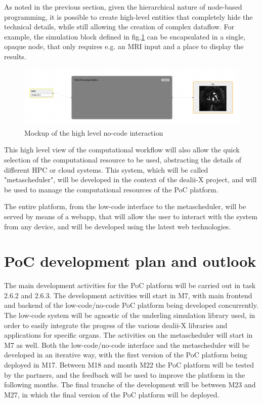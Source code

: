\documentclass[a4paper,12pt]{article}
\begin{document}
As noted in the previous section, given the hierarchical nature of node-based programming, it is possible to create high-level entities that completely hide the technical details, while still allowing the creation of complex dataflow. For example, the simulation block defined in fig.\ref{nocode-sim} can be encapsulated in a single, opaque node, that only requires e.g. an MRI input and a place to display the results. 

\begin{figure}
    \includegraphics[width=400pt]{nocode-sim.png}
    \caption{Mockup of the high level no-code interaction}
    \label{nocode-sim}
\end{figure}


This high level view of the computational workflow will also allow the quick selection of the computational resource to be used, abstracting the details of different HPC or cloud systems. This system, which will be called "metascheduler", will be developed in the context of the dealii-X project, and will be used to manage the computational resources of the PoC platform.

The entire platform, from the low-code interface to the metascheduler, will be served by means of a webapp, that will allow the user to interact with the system from any device, and will be developed using the latest web technologies. 

\section{\textcolor{EUblue}{PoC development plan and outlook}}

The main development activities for the PoC platform will be carried out in task 2.6.2 and 2.6.3. The development activities will start in M7, with main frontend and backend of the low-code/no-code PoC platform being developed concurrently. The low-code system will be agnostic of the underling simulation library used, in order to easily integrate the progess of the various dealii-X libraries and applications for specific organs. The activities on the metascheduler will start in M7 as well. Both the low-code/no-code interface and the metascheduler will be developed in an iterative way, with the first version of the PoC platform being deployed in M17. Between M18 and month M22 the PoC platform will be tested by the partners, and the feedback will be used to improve the platform in the following months. The final tranche of the development will be between M23 and M27, in which the final version of the PoC platform will be deployed.
\end{document}
